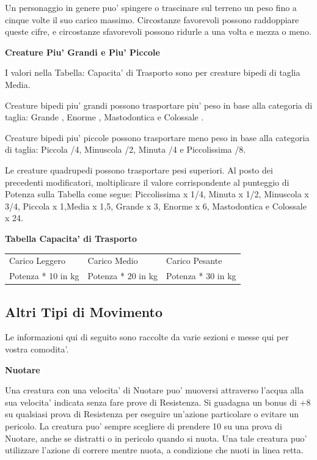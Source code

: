 \documentclass[a4paper,11pt,twoside,openany]{dndbook}
\begin{document}
{Un personaggio in genere puo' spingere o trascinare sul terreno un peso fino a cinque volte il suo carico massimo. Circostanze favorevoli possono raddoppiare queste cifre, e circostanze sfavorevoli possono ridurle a una volta e mezza o meno.

\textbf{Creature Piu' Grandi e Piu' Piccole}

I valori nella Tabella: Capacita' di Trasporto sono per creature bipedi di taglia Media.

Creature bipedi piu' grandi possono trasportare piu' peso in base alla categoria di taglia: Grande , Enorme , Mastodontica  e Colossale .

Creature bipedi piu' piccole possono trasportare meno peso in base alla categoria di taglia: Piccola /4, Minuscola /2, Minuta /4 e Piccolissima /8.

Le creature quadrupedi possono trasportare pesi superiori. Al posto dei precedenti modificatori, moltiplicare il valore corrispondente al punteggio di Potenza sulla Tabella come segue: Piccolissima x 1/4, Minuta x 1/2, Minuscola x 3/4, Piccola x 1,Media x 1,5, Grande x 3, Enorme x 6, Mastodontica  e Colossale x 24.


\bigskip

\textbf{Tabella Capacita' di Trasporto}

\begin{tabular}[c]{@{}lll@{}}
\toprule 
Carico Leggero & Carico Medio & Carico Pesante\tabularnewline
Potenza {*} 10 in kg & Potenza {*} 20 in kg & Potenza {*} 30 in kg\tabularnewline
\bottomrule
\end{tabular}



\subsection{Altri Tipi di Movimento}

\label{altri-tipi-di-movimento}

Le informazioni qui di seguito sono raccolte da varie sezioni e messe
qui per vostra comodita'.

\textbf{Nuotare}

Una creatura con una velocita' di Nuotare puo' muoversi attraverso l'acqua alla sua velocita' indicata senza fare prove di Resistenza. Si guadagna un bonus di +8 su qualsiasi prova di Resistenza per eseguire un'azione particolare o evitare un pericolo. La creatura puo' sempre scegliere di prendere 10 su una prova di Nuotare, anche se distratti o in pericolo quando si nuota. Una tale creatura puo' utilizzare l'azione di correre mentre nuota, a condizione che nuoti in linea retta.

}
\end{document}
